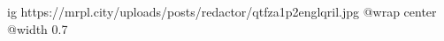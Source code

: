  
 
 
 
 

\ifcmt
  ig https://mrpl.city/uploads/posts/redactor/qtfza1p2englqril.jpg
  @wrap center
  @width 0.7
\fi
